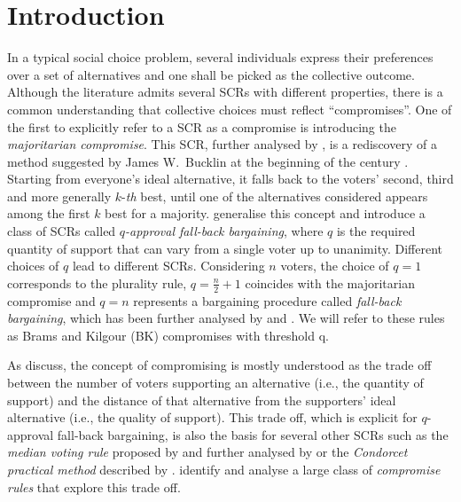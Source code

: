 \section{Introduction}
\label{sec:introduction}
In a typical social choice problem, several individuals express their preferences over a set of alternatives and one shall be picked as the collective outcome. Although the literature admits several \acp{SCR} with different properties, there is a common understanding that collective choices must reflect “compromises”. One of the first to explicitly refer to a \ac{SCR} as a compromise is \citet{Sertel1986} introducing the \emph{majoritarian compromise}. This \ac{SCR}, further analysed by \citet{Sertel1999}, is a rediscovery of a method suggested by James W.\ Bucklin at the beginning of the  century \citep{Erdelyi2015}. Starting from everyone’s ideal alternative, it falls back to the voters’ second, third and more generally $k$-\emph{th} best, until one of the alternatives considered appears among the first $k$ best for a majority. \citet{Brams2001} generalise this concept and introduce a class of \acp{SCR} called $q$\emph{-approval fall-back bargaining}, where $q$ is the required quantity of support that can vary from a single voter up to unanimity. Different choices of $q$ lead to different \acp{SCR}. Considering $n$ voters, the choice of $q=1$ corresponds to the plurality rule, $q=\frac{n}{2}+1$ coincides with the majoritarian compromise and $q=n$ represents a bargaining procedure called \emph{fall-back bargaining}, which has been further analysed by \citet{Kibris2007} and \citet{Congar2012}. We will refer to these rules as Brams and Kilgour (BK) compromises with threshold q.

As \citet{OezkalSanver2004} discuss, the concept of compromising is mostly understood as the trade off between the number of voters supporting an alternative (i.e., the quantity of support) and the distance of that alternative from the supporters’ ideal alternative (i.e., the quality of support). This trade off, which is explicit for $q$-approval fall-back bargaining, is also the basis for several other \acp{SCR} such as the \emph{median voting rule} proposed by \citet{Bassett1999} and further analysed by \citet{Gehrlein2003} or the \emph{Condorcet practical method} described by \citet{Nurmi1999}.  identify and analyse a large class of \emph{compromise rules} that explore this trade off.

